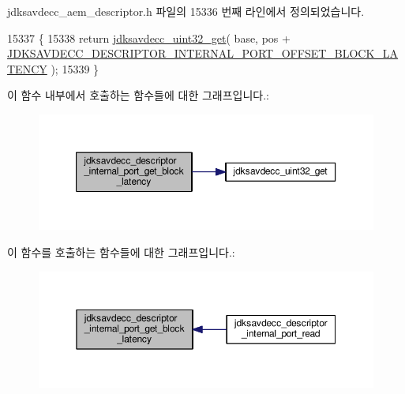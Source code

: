 jdksavdecc\+\_\+aem\+\_\+descriptor.\+h 파일의 15336 번째 라인에서 정의되었습니다.


\begin{DoxyCode}
15337 \{
15338     \textcolor{keywordflow}{return} \hyperlink{group__endian_gaefcf5bd4f368997a82f358ab89052d6b}{jdksavdecc\_uint32\_get}( base, pos + 
      \hyperlink{group__descriptor__internal__port_ga6ae94a3ccca7c69be0eeade4b174485b}{JDKSAVDECC\_DESCRIPTOR\_INTERNAL\_PORT\_OFFSET\_BLOCK\_LATENCY}
       );
15339 \}
\end{DoxyCode}


이 함수 내부에서 호출하는 함수들에 대한 그래프입니다.\+:
\nopagebreak
\begin{figure}[H]
\begin{center}
\leavevmode
\includegraphics[width=350pt]{group__descriptor__internal__port_gaa85d65e354a30fab5fe1d7fe022cc920_cgraph}
\end{center}
\end{figure}




이 함수를 호출하는 함수들에 대한 그래프입니다.\+:
\nopagebreak
\begin{figure}[H]
\begin{center}
\leavevmode
\includegraphics[width=350pt]{group__descriptor__internal__port_gaa85d65e354a30fab5fe1d7fe022cc920_icgraph}
\end{center}
\end{figure}


